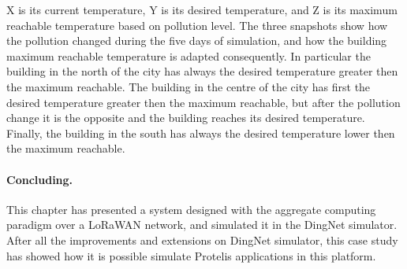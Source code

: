 % 
X is its current temperature, Y is its desired temperature, and Z is its maximum reachable temperature based on pollution level.
The three snapshots show how the pollution changed during the five days of simulation, and how the building maximum reachable temperature is adapted consequently.
In particular the building in the north of the city has always the desired temperature greater then the maximum reachable. 
The building in the centre of the city has first the desired temperature greater then the maximum reachable, but after the pollution change it is the opposite and the building reaches its desired temperature.
Finally, the building in the south has always the desired temperature lower then the maximum reachable.

\paragraph{Concluding.} This chapter has presented a system designed with the aggregate computing paradigm over a LoRaWAN network, and simulated it in the DingNet simulator.
After all the improvements and extensions on DingNet simulator, this case study has showed how it is possible simulate Protelis applications in this platform. 

